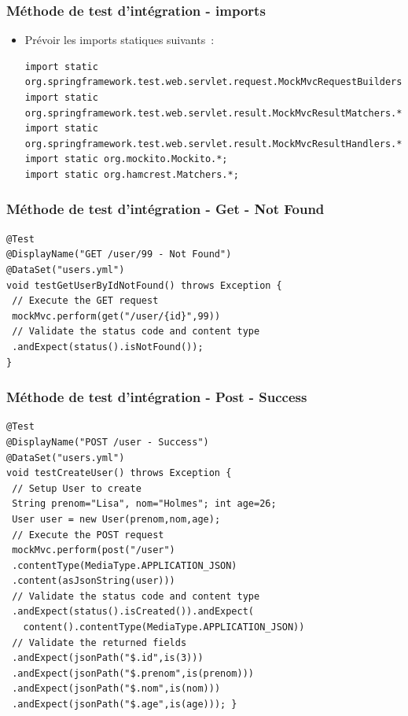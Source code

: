\documentclass{beamer}
\begin{document}
\begin{frame}[fragile]
\frametitle{Méthode de test d'intégration - imports}

	\begin{itemize}
		\item Prévoir les imports statiques suivants~:
\begin{lstlisting}
import static org.springframework.test.web.servlet.request.MockMvcRequestBuilders.*;
import static org.springframework.test.web.servlet.result.MockMvcResultMatchers.*;
import static org.springframework.test.web.servlet.result.MockMvcResultHandlers.*;
import static org.mockito.Mockito.*;
import static org.hamcrest.Matchers.*;
\end{lstlisting}
	\end{itemize}
\end{frame}

\begin{frame}[fragile]
	\frametitle{Méthode de test d'intégration - Get - Not Found}
\begin{lstlisting}
@Test
@DisplayName("GET /user/99 - Not Found")
@DataSet("users.yml")
void testGetUserByIdNotFound() throws Exception {
 // Execute the GET request
 mockMvc.perform(get("/user/{id}",99))
 // Validate the status code and content type
 .andExpect(status().isNotFound());
}
\end{lstlisting}
\end{frame}

\begin{frame}[fragile]
	\frametitle{Méthode de test d'intégration - Post - Success}
\begin{lstlisting}
@Test
@DisplayName("POST /user - Success")
@DataSet("users.yml")
void testCreateUser() throws Exception {
 // Setup User to create
 String prenom="Lisa", nom="Holmes"; int age=26;
 User user = new User(prenom,nom,age);
 // Execute the POST request
 mockMvc.perform(post("/user")
 .contentType(MediaType.APPLICATION_JSON)
 .content(asJsonString(user)))
 // Validate the status code and content type
 .andExpect(status().isCreated()).andExpect(
   content().contentType(MediaType.APPLICATION_JSON))
 // Validate the returned fields
 .andExpect(jsonPath("$.id",is(3)))
 .andExpect(jsonPath("$.prenom",is(prenom)))
 .andExpect(jsonPath("$.nom",is(nom)))
 .andExpect(jsonPath("$.age",is(age))); }
\end{lstlisting}
\end{frame}
\end{document}
